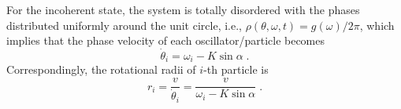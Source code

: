 \documentclass{article}
\begin{document}
For the incoherent state, the system is totally disordered with the phases distributed uniformly around the unit circle, i.e., $\rho\left(\theta, \omega, t\right) = g(\omega)/2\pi$, which implies that the phase velocity of each oscillator/particle becomes
\begin{equation}
    \dot{\theta}_i=\omega_i-K\sin \alpha \;.
\end{equation}
Correspondingly, the rotational radii of $i$-th particle is
\begin{equation}
    r_i=\frac{v}{\dot{\theta}_i}=\frac{v}{\omega _i-K\sin \alpha}\;.
\end{equation}

\end{document}

